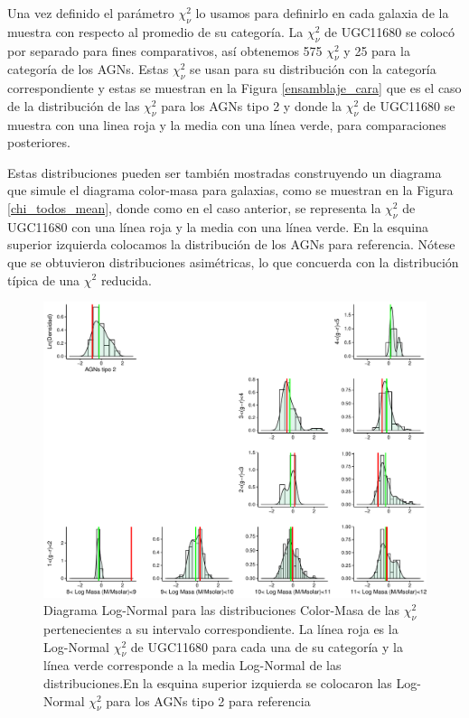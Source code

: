 \bigskip

\noindent Una vez definido el parámetro $\chi^{2}_{\nu}$ lo usamos para definirlo en cada galaxia de la muestra  con respecto al promedio de su categoría. La $\chi^{2}_{\nu}$ de UGC11680 se colocó por separado para fines comparativos, así obtenemos 575 $\chi^{2}_{\nu}$ y 25 para la categoría de los AGNs. Estas $\chi^{2}_{\nu}$ se usan para su distribución con la categoría correspondiente y estas se muestran en la Figura \ref{ensamblaje_cara} que es el caso de la distribución de las $\chi^{2}_{\nu}$ para los AGNs tipo 2 y donde la $\chi^{2}_{\nu}$ de UGC11680 se muestra con una linea roja y la media con una línea verde, para comparaciones posteriores.

\bigskip

\noindent Estas distribuciones pueden ser también mostradas construyendo un diagrama que simule el diagrama color-masa para galaxias, como  se muestran en la Figura \ref{chi_todos_mean}, donde como en el caso anterior, se representa la $\chi^{2}_{\nu}$ de UGC11680 con una línea roja y la media con una línea verde. En la esquina superior izquierda colocamos la distribución de los AGNs para referencia. Nótese que se obtuvieron distribuciones  asimétricas, lo que concuerda con la distribución típica de una $\chi^{2}$ reducida.

\begin{figure}
  \centering
    \includegraphics[scale=0.5]{log_chi_perl.pdf}
  \caption[Diagrama de distribuciones Log-Normal para $\chi^{2}_{\nu}$ en Color-Masa]{Diagrama Log-Normal para las distribuciones Color-Masa  de las $\chi^2_{\nu}$ pertenecientes a su intervalo correspondiente. La línea roja es la Log-Normal $\chi^2_{\nu}$ de UGC11680 para cada una de su categoría y la línea verde corresponde a la media Log-Normal de las distribuciones.En la esquina superior izquierda se colocaron las Log-Normal $\chi^2_{\nu}$ para los AGNs tipo 2  para referencia }
  \label{chi_todos_log}
\end{figure}



